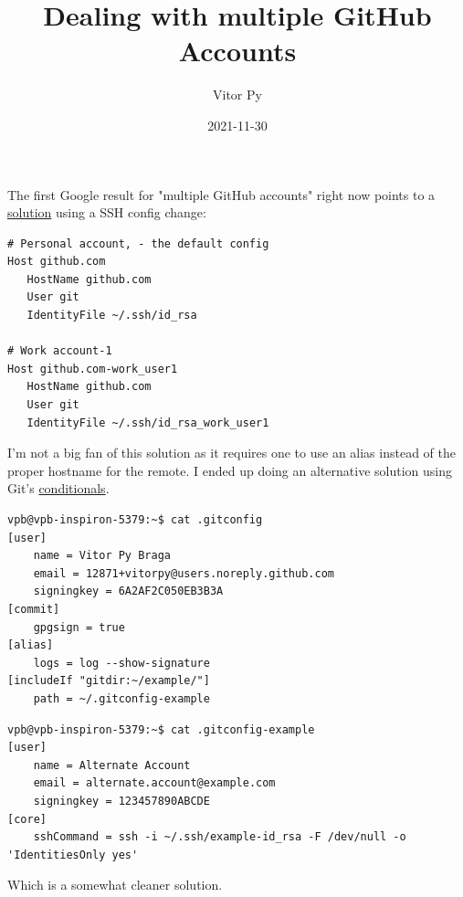 \documentclass{article}
\title{Dealing with multiple GitHub Accounts}
\author{Vitor Py}
\date{2021-11-30}
\begin{document}

\maketitle

The first Google result for "multiple GitHub accounts" right now points to a \href{https://www.freecodecamp.org/news/manage-multiple-github-accounts-the-ssh-way-2dadc30ccaca/}{solution} using a SSH config change:

\begin{verbatim}
# Personal account, - the default config
Host github.com
   HostName github.com
   User git
   IdentityFile ~/.ssh/id_rsa

# Work account-1
Host github.com-work_user1
   HostName github.com
   User git
   IdentityFile ~/.ssh/id_rsa_work_user1
\end{verbatim}

I'm not a big fan of this solution as it requires one to use an alias instead of the proper hostname for the remote. I ended up doing an alternative solution using Git's \href{https://blog.jiayu.co/2019/02/conditional-git-configuration/}{conditionals}.

\begin{verbatim}
vpb@vpb-inspiron-5379:~$ cat .gitconfig
[user]
    name = Vitor Py Braga
    email = 12871+vitorpy@users.noreply.github.com
    signingkey = 6A2AF2C050EB3B3A
[commit]
    gpgsign = true
[alias]
    logs = log --show-signature
[includeIf "gitdir:~/example/"]
    path = ~/.gitconfig-example
\end{verbatim}

\begin{verbatim}
vpb@vpb-inspiron-5379:~$ cat .gitconfig-example
[user]
    name = Alternate Account
    email = alternate.account@example.com
    signingkey = 123457890ABCDE
[core]
    sshCommand = ssh -i ~/.ssh/example-id_rsa -F /dev/null -o 'IdentitiesOnly yes'
\end{verbatim}

Which is a somewhat cleaner solution.


\end{document}
